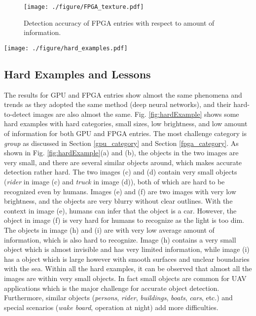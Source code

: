 \documentclass[10pt,journal,compsoc]{IEEEtran}
\begin{document}
\begin{figure}%
\centering
  \texttt{[image: ./figure/FPGA\_texture.pdf]}
  \caption{Detection accuracy of FPGA entries with respect to amount of information.}
  \label{fig:FPGA_texture}
\end{figure}


\begin{figure*}
\vspace{-6pt}
  \texttt{[image: ./figure/hard\_examples.pdf]}
  \vspace{-20pt}
  \caption{Hard examples with hard categories, small size, low brightness, and low amount of information in the challenge.}
    \vspace{-1pt}
  \label{fig:hardExample}
  \vspace{-10pt}
\end{figure*}
\subsection{Hard Examples and Lessons}

The results for GPU and FPGA entries show almost the same phenomena and trends as they adopted the same method (deep neural networks), and their hard-to-detect images are also almost the same.
Fig. \ref{fig:hardExample} shows some hard examples with hard categories, small sizes, low brightness, and low amount of information for both GPU and FPGA entries.
The most challenge category is \textit{group} as discussed in Section \ref{gpu_category} and Section \ref{fpga_category}.
As shown in Fig. \ref{fig:hardExample}(a) and (b), the objects in the two images are very small, and there are several similar objects around, which makes accurate detection rather hard.
The two images (c) and (d) contain very small objects (\textit{rider} in image (c) and \textit{truck} in image (d)), both of which are hard to be recognized even by humans.
Images (e) and (f) are two images with very low brightness, and the objects are very blurry without clear outlines.
With the context in image (e), humans can infer that the object is a car.
However, the object in image (f) is very hard for humans to recognize as the light is too dim.
The objects in image (h) and (i) are with very low average amount of information, which is also hard to recognize.
Image (h) contains a very small object which is almost invisible and has very limited information, while image (i) has a object which is large however with smooth surfaces and unclear boundaries with the sea.
Within all the hard examples, it can be observed that almost all the images are within very small objects.
In fact small objects are common for UAV applications which is the major challenge for accurate object detection.
Furthermore, similar objects (\textit{persons}, \textit{rider}, \textit{buildings}, \textit{boats}, \textit{cars}, etc.) and special scenarios (\textit{wake board}, operation at night) add more difficulties.
\end{document}
